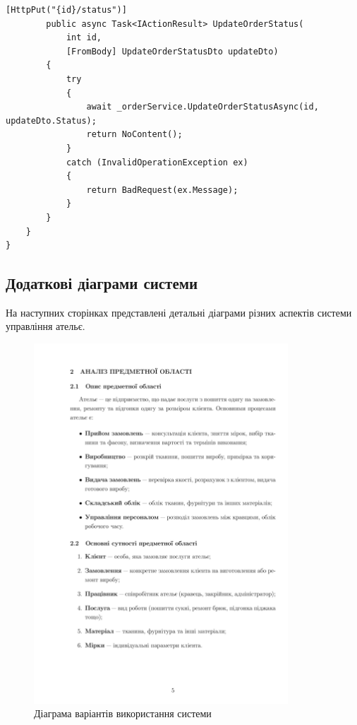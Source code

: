 \documentclass[14pt,a4paper]{extarticle}
\begin{document}
\begin{lstlisting}[language={[Sharp]C}, caption=OrdersController, basicstyle=\small\ttfamily, breaklines=true, frame=single]
        [HttpPut("{id}/status")]
        public async Task<IActionResult> UpdateOrderStatus(
            int id, 
            [FromBody] UpdateOrderStatusDto updateDto)
        {
            try
            {
                await _orderService.UpdateOrderStatusAsync(id, updateDto.Status);
                return NoContent();
            }
            catch (InvalidOperationException ex)
            {
                return BadRequest(ex.Message);
            }
        }
    }
}
\end{lstlisting}

\newpage
\subsection{Додаткові діаграми системи}

На наступних сторінках представлені детальні діаграми різних аспектів системи управління ательє.

\begin{figure}[h!]
\centering
\includegraphics[width=0.85\textwidth]{diagrams/diagram-06.png}
\caption{Діаграма варіантів використання системи}
\end{figure}
\end{document}
